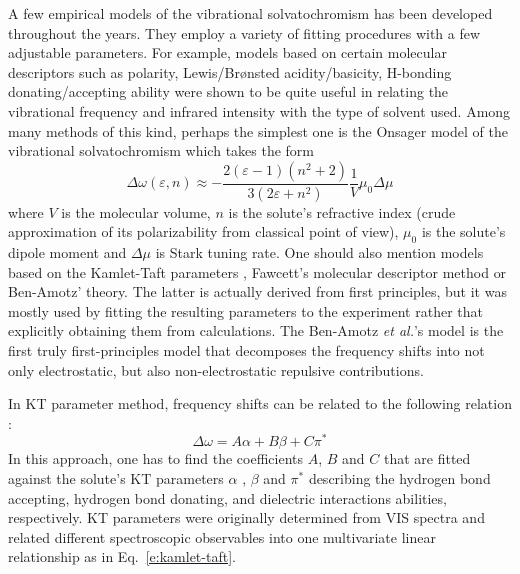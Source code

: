 \documentclass[b5paper,oneside,fleqn,11pt]{book}
\begin{document}
\begin{refsection}
A few empirical models of the vibrational solvatochromism has been developed throughout the years.
They employ a variety of fitting procedures with a few adjustable parameters. For example, 
models based on certain molecular descriptors such as polarity, Lewis\slash{}Br{\o}nsted acidity\slash{}basicity, 
H-bonding donating\slash{}accepting ability were shown to be quite useful in relating the vibrational
frequency and infrared intensity with the type of solvent used. Among many methods of this kind,
perhaps the simplest one 
is the Onsager model of the vibrational solvatochromism which
takes the form
%
\begin{equation} \label{e:vibr-onsager}
\Delta \omega(\varepsilon,n) \approx - \frac{2(\varepsilon-1)(n^2+2)}{3(2\varepsilon+n^2)} \frac{1}{V}
 \mu_0\Delta\mu
\end{equation}
%
where $V$ is the molecular volume, $n$ is the solute's refractive index
(crude approximation of its polarizability from classical point of view),
$\mu_0$ is the solute's dipole moment and $\Delta\mu$ is 
Stark tuning rate. \citep{Levinson.Fried.Boxer.JPCB.2012}
One should also mention models based on the
Kamlet\hyp{}Taft parameters \citep{Kamlet.Taft.JACS.1976,Taft.Kamlet.JACS.1976,Kamlet.Abboud.Taft.JACS.1977}, 
Fawcett's molecular descriptor method \citep{Reimers.Hall.JACS.1999,
Fawcett.Liu.Kessler.JPC.1993,Fawcett.Kloss.JCP.1996} or Ben-Amotz' theory. \citep{Ben-Amotz.Lee.Cho.List.JCP.1992} 
The latter is actually derived from first principles, but it was mostly used by fitting
the resulting parameters to the experiment rather that explicitly obtaining them from calculations.
The Ben-Amotz \emph{et al.}'s model is the first
truly first\hyp{}principles model that decomposes the frequency shifts into not only electrostatic, 
but also non\hyp{}electrostatic repulsive contributions.

In KT parameter method, frequency shifts can be related to the following
relation \citep{Zhang.Markiewicz.Doerksen.Smith.Gai.PCCP.2015}:
%
\begin{equation} \label{e:kamlet-taft}
\Delta \omega = A\alpha + B\beta + C\pi^{*}
\end{equation}
%
In this approach, one has to
find the coefficients $A$, $B$ and $C$ that are fitted against
the solute's KT parameters $\alpha$ \citep{Taft.Kamlet.JACS.1976}, 
$\beta$ \citep{Kamlet.Taft.JACS.1976} and $\pi^{*}$ \citep{Kamlet.Abboud.Taft.JACS.1977} 
describing the hydrogen bond accepting,
hydrogen bond donating, and dielectric interactions abilities, respectively.
KT parameters were originally determined from VIS spectra and related different
spectroscopic observables into one multivariate linear relationship as in Eq.~\eqref{e:kamlet-taft}.


\end{refsection}
\end{document}
